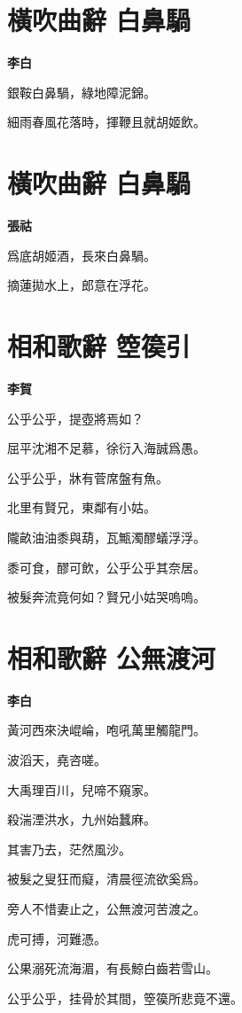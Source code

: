 \documentclass[12pt,a4paper]{ctexbook}
\begin{document}
\section{橫吹曲辭 白鼻騧}
\textbf{李白}\par\vspace{0.5em}
銀鞍白鼻騧，綠地障泥錦。\par
細雨春風花落時，揮鞭且就胡姬飲。\par

\section{橫吹曲辭 白鼻騧}
\textbf{張祜}\par\vspace{0.5em}
爲底胡姬酒，長來白鼻騧。\par
摘蓮拋水上，郎意在浮花。\par

\section{相和歌辭 箜篌引}
\textbf{李賀}\par\vspace{0.5em}
公乎公乎，提壺將焉如？\par
屈平沈湘不足慕，徐衍入海誠爲愚。\par
公乎公乎，牀有菅席盤有魚。\par
北里有賢兄，東鄰有小姑。\par
隴畝油油黍與葫，瓦甒濁醪蟻浮浮。\par
黍可食，醪可飲，公乎公乎其奈居。\par
被髮奔流竟何如？賢兄小姑哭嗚嗚。\par

\section{相和歌辭 公無渡河}
\textbf{李白}\par\vspace{0.5em}
黃河西來決崐崘，咆吼萬里觸龍門。\par
波滔天，堯咨嗟。\par
大禹理百川，兒啼不窺家。\par
殺湍湮洪水，九州始蠶麻。\par
其害乃去，茫然風沙。\par
被髮之叟狂而癡，清晨徑流欲奚爲。\par
旁人不惜妻止之，公無渡河苦渡之。\par
虎可搏，河難憑。\par
公果溺死流海湄，有長鯨白齒若雪山。\par
公乎公乎，挂骨於其間，箜篌所悲竟不還。\par
\end{document}
